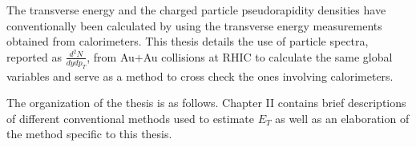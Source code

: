 The transverse energy and the charged particle pseudorapidity densities have conventionally been calculated by using the transverse energy measurements obtained from calorimeters. This thesis details the use of particle spectra, reported as $\frac{d^{2}N}{dydp_{T}}$, from Au+Au collisions at RHIC to calculate the same global variables and serve as a method to cross check the ones involving calorimeters.

The organization of the thesis is as follows. Chapter II contains brief descriptions of different conventional methods used to estimate $E_{T}$ as well as an elaboration of the method specific to this thesis.
